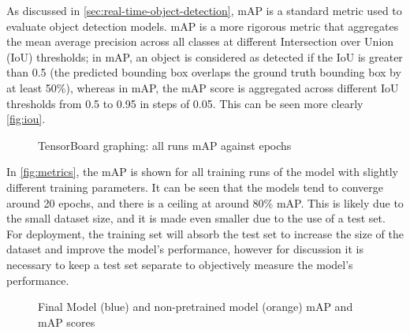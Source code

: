 As discussed in \autoref{sec:real-time-object-detection}, mAP is a standard metric used to evaluate object detection models. mAP is a more rigorous metric that aggregates the mean average precision across all classes at different Intersection over Union (IoU) thresholds; in mAP, an object is considered as detected if the IoU is greater than 0.5 (the predicted bounding box overlaps the ground truth bounding box by at least 50\%), whereas in mAP, the mAP score is aggregated across different IoU thresholds from 0.5 to 0.95 in steps of 0.05. This can be seen more clearly \autoref{fig:iou}.
  
\begin{figure}[H]
  \centering
   
  \caption{TensorBoard graphing: all runs mAP against epochs}
  \label{fig:metrics}
\end{figure}
  
In \autoref{fig:metrics}, the mAP is shown for all training runs of the model with slightly different training parameters. It can be seen that the models tend to converge around 20 epochs, and there is a ceiling at around 80\% mAP. This is likely due to the small dataset size, and it is made even smaller due to the use of a test set. For deployment, the training set will absorb the test set to increase the size of the dataset and improve the model's performance, however for discussion it is necessary to keep a test set separate to objectively measure the model's performance.


\begin{figure}[H]
  \centering
  \begin{minipage}[t]{0.8\textwidth}
    \centering
    
  \end{minipage}
  \par\medskip
  \begin{minipage}[t]{0.8\textwidth}
    \centering
    
  \end{minipage}
  \caption{Final Model (blue) and non-pretrained model (orange) mAP and mAP scores}
  \label{fig:final-model-metrics}
\end{figure}

